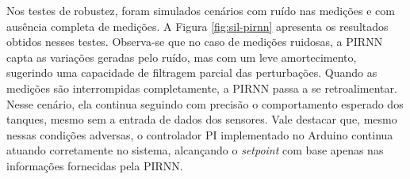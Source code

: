 
Nos testes de robustez, foram simulados cenários com ruído nas medições e com ausência completa de medições. A Figura \ref{fig:sil-pirnn} apresenta os resultados obtidos nesses testes. Observa-se que no caso de medições ruidosas, a PIRNN capta as variações geradas pelo ruído, mas com um leve amortecimento, sugerindo uma capacidade de filtragem parcial das perturbações. Quando as medições são interrompidas completamente, a PIRNN passa a se retroalimentar. Nesse cenário, ela continua seguindo com precisão o comportamento esperado dos tanques, mesmo sem a entrada de dados dos sensores. Vale destacar que, mesmo nessas condições adversas, o controlador PI implementado no Arduino continua atuando corretamente no sistema, alcançando o \textit{setpoint} com base apenas nas informações fornecidas pela PIRNN.

